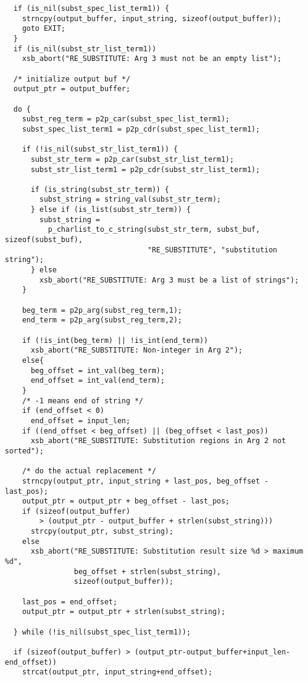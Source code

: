 \begin{verbatim}
  if (is_nil(subst_spec_list_term1)) {
    strncpy(output_buffer, input_string, sizeof(output_buffer));
    goto EXIT;
  }
  if (is_nil(subst_str_list_term1))
    xsb_abort("RE_SUBSTITUTE: Arg 3 must not be an empty list");

  /* initialize output buf */
  output_ptr = output_buffer;

  do {
    subst_reg_term = p2p_car(subst_spec_list_term1);
    subst_spec_list_term1 = p2p_cdr(subst_spec_list_term1);

    if (!is_nil(subst_str_list_term1)) {
      subst_str_term = p2p_car(subst_str_list_term1);
      subst_str_list_term1 = p2p_cdr(subst_str_list_term1);

      if (is_string(subst_str_term)) {
        subst_string = string_val(subst_str_term);
      } else if (is_list(subst_str_term)) {
        subst_string =
          p_charlist_to_c_string(subst_str_term, subst_buf, sizeof(subst_buf),
                                 "RE_SUBSTITUTE", "substitution string");
      } else 
        xsb_abort("RE_SUBSTITUTE: Arg 3 must be a list of strings");
    }

    beg_term = p2p_arg(subst_reg_term,1);
    end_term = p2p_arg(subst_reg_term,2);

    if (!is_int(beg_term) || !is_int(end_term))
      xsb_abort("RE_SUBSTITUTE: Non-integer in Arg 2");
    else{
      beg_offset = int_val(beg_term);
      end_offset = int_val(end_term);
    }
    /* -1 means end of string */
    if (end_offset < 0)
      end_offset = input_len;
    if ((end_offset < beg_offset) || (beg_offset < last_pos))
      xsb_abort("RE_SUBSTITUTE: Substitution regions in Arg 2 not sorted");

    /* do the actual replacement */
    strncpy(output_ptr, input_string + last_pos, beg_offset - last_pos);
    output_ptr = output_ptr + beg_offset - last_pos;
    if (sizeof(output_buffer)
        > (output_ptr - output_buffer + strlen(subst_string)))
      strcpy(output_ptr, subst_string);
    else
      xsb_abort("RE_SUBSTITUTE: Substitution result size %d > maximum %d",
                beg_offset + strlen(subst_string),
                sizeof(output_buffer));
    
    last_pos = end_offset;
    output_ptr = output_ptr + strlen(subst_string);

  } while (!is_nil(subst_spec_list_term1));

  if (sizeof(output_buffer) > (output_ptr-output_buffer+input_len-end_offset))
    strcat(output_ptr, input_string+end_offset);


\end{verbatim}
